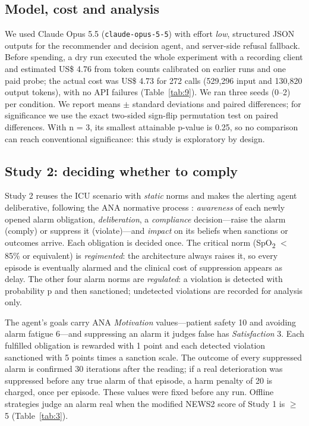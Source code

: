 \documentclass{ieeeaccess}
\begin{document}
\subsection{Model, cost and analysis}\label{sec:3.6}
We used Claude Opus 5.5 (\texttt{claude-opus-5-5}) with effort \emph{low}, structured JSON outputs for the recommender and decision agent, and server-side refusal fallback. Before spending, a dry run executed the whole experiment with a recording client and estimated US\$ 4.76 from token counts calibrated on earlier runs and one paid probe; the actual cost was US\$ 4.73 for 272 calls (529,296 input and 130,820 output tokens), with no API failures (Table~\ref{tab:9}). We ran three seeds (0–2) per condition. We report means $\pm$ standard deviations and paired differences; for significance we use the exact two-sided sign-flip permutation test on paired differences. With n = 3, its smallest attainable p-value is 0.25, so no comparison can reach conventional significance: this study is exploratory by design.

\subsection{Study 2: deciding whether to comply}\label{sec:3.7}
Study 2 reuses the ICU scenario with \emph{static} norms and makes the alerting agent deliberative, following the ANA normative process \cite{viana2022creating}: \emph{awareness} of each newly opened alarm obligation, \emph{deliberation}, a \emph{compliance} decision—raise the alarm (comply) or suppress it (violate)—and \emph{impact} on its beliefs when sanctions or outcomes arrive. Each obligation is decided once. The critical norm (SpO\textsubscript{2} $<$ 85\% or equivalent) is \emph{regimented}: the architecture always raises it, so every episode is eventually alarmed and the clinical cost of suppression appears as delay. The other four alarm norms are \emph{regulated}: a violation is detected with probability p and then sanctioned; undetected violations are recorded for analysis only.

The agent's goals carry ANA \emph{Motivation} values—patient safety 10 and avoiding alarm fatigue 6—and suppressing an alarm it judges false has \emph{Satisfaction} 3. Each fulfilled obligation is rewarded with 1 point and each detected violation sanctioned with 5 points times a sanction scale. The outcome of every suppressed alarm is confirmed 30 iterations after the reading; if a real deterioration was suppressed before any true alarm of that episode, a harm penalty of 20 is charged, once per episode. These values were fixed before any run. Offline strategies judge an alarm real when the modified NEWS2 score of Study 1 is $\geq$ 5 (Table~\ref{tab:3}).
\end{document}
